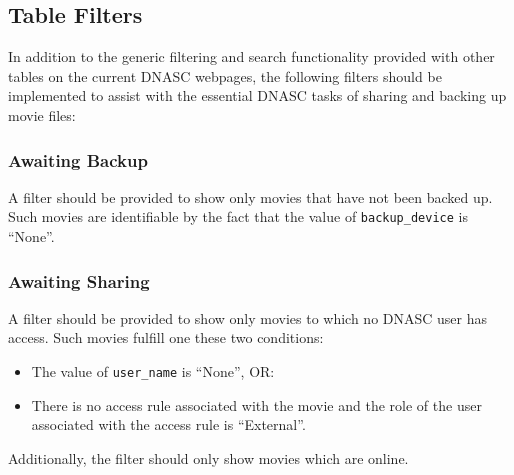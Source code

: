 \subsection{Table Filters}

In addition to the generic filtering and search functionality provided with other tables on the
current DNASC webpages, the following filters should be implemented to assist with the essential 
DNASC tasks of sharing and backing up movie files:

\subsubsection{Awaiting Backup}

A filter should be provided to show only movies that have not been backed up.
Such movies are identifiable by the fact that the value of \texttt{backup\_device} is ``None''. 

\subsubsection{Awaiting Sharing}

A filter should be provided to show only movies to which no DNASC user has access. Such movies 
fulfill one these two conditions:
\begin{itemize}\itemsep1pt
    \item The value of \texttt{user\_name} is ``None'', OR:
    \item There is no access rule associated with the movie and the role of the user associated 
    with the access rule is ``External''.
\end{itemize}

\noindent Additionally, the filter should only show movies which are online.